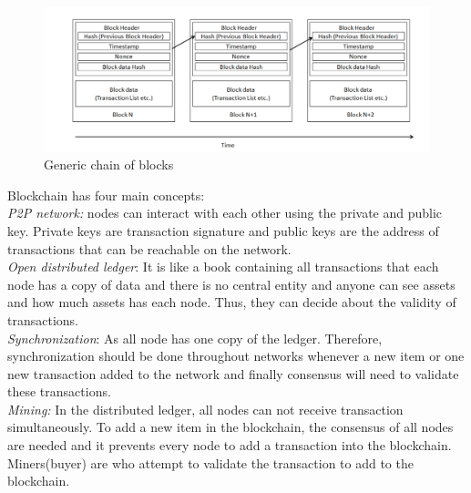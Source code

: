 \begin{center}
	\begin{figure}[htb!]
		
		\begin{minipage}{0.55\linewidth}
			\centering
			\includegraphics[width=1.95\textwidth]{images/chap01_BlockChain.png}
		\end{minipage}
		\caption[Generic chain of blocks]{Generic chain of blocks}
		
		
	\end{figure}
	
\end{center}
Blockchain has four main concepts: \\
\textit{P2P network:} nodes can interact with each other using the private and public key. Private keys are transaction signature and public keys are the address of transactions that can be reachable on the network. \\
\textit{Open distributed ledger}: It is like a book containing all transactions that each node has a copy of data and there is no central entity and anyone can see assets and how much assets has each node. Thus, they can decide about the validity of transactions.\\
\textit{Synchronization}: As all node has one copy of the ledger. Therefore, synchronization should be done throughout networks whenever a new item or one new transaction added to the network and finally consensus will need to validate these transactions.\\
\textit{Mining: }In the distributed ledger, all nodes can not receive transaction simultaneously. To add a new item in the blockchain, the consensus of all nodes are needed and it prevents every node to add a transaction into the blockchain. Miners(buyer) are who attempt to validate the transaction to add to the blockchain.\\
